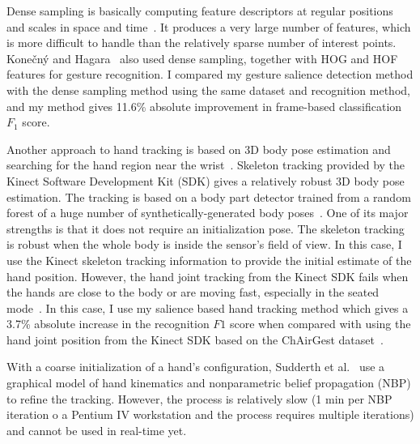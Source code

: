 Dense sampling is basically computing feature descriptors at regular positions and scales in space and time~\cite{wang-spatio-09}.
It produces a very large number of features, which is more difficult to handle than the relatively sparse number of interest points.
Kone\v{c}n\'{y} and Hagara~\cite{konecny13} also used dense sampling, together
with HOG and HOF features for gesture recognition. I compared my gesture
salience detection method with the dense sampling method using the same 
dataset and recognition method, and my method gives 11.6\%
absolute improvement in frame-based classification $F_1$ score.

Another approach to hand tracking is based on 3D body pose estimation and searching for the hand region near the wrist~\cite{song11}.
Skeleton tracking provided by the Kinect Software Development Kit (SDK) gives a relatively robust 3D body pose estimation. The tracking
is based on a body part detector trained from a random forest of a huge number
of synthetically-generated body poses~\cite{shotton13}. One of its major
strengths is that it does not require an initialization pose. The skeleton tracking is robust when the whole body is inside the sensor's field of view. In
this case, I use the Kinect skeleton tracking information to provide the
initial estimate of the hand position. However, the hand joint tracking
from the Kinect SDK fails when the hands are close to the body or are moving
fast, especially in the seated mode~\cite{yin13}.
In this case, I use my salience based hand tracking method which
gives a 3.7\% absolute increase in the recognition $F1$ score when compared with
using the hand joint position from the Kinect SDK based on the ChAirGest
dataset~\cite{Ruffieux2013}.

With a coarse initialization of a hand's configuration, Sudderth et
al.~\cite{sudderth04} use a graphical model of hand kinematics and nonparametric
belief propagation (NBP) to refine the tracking. However, the process is
relatively slow (1 min per NBP iteration o a Pentium IV workstation and the
process requires multiple iterations) and cannot be used in real-time yet. 


